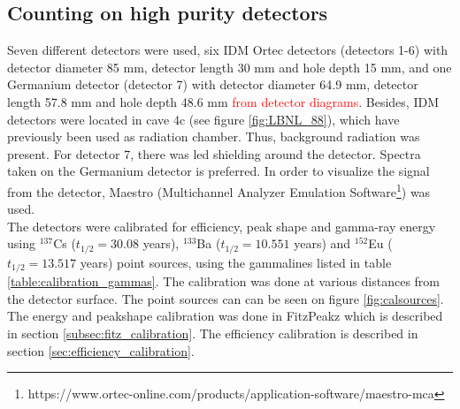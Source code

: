 \documentclass[a4paper,11pt,twoside]{book}
\begin{document}

\subsection{Counting on high purity detectors}

\noindent 
Seven different detectors were used, six IDM Ortec detectors (detectors 1-6) with detector diameter 85 mm, detector length 30 mm and hole depth 15 mm, and one Germanium detector (detector 7) with detector diameter 64.9 mm, detector length 57.8 mm and hole depth 48.6 mm \textcolor{red}{from detector diagrams}. Besides, IDM detectors were located in cave 4c (see figure \ref{fig:LBNL_88}), which have previously been used as radiation chamber. Thus, background radiation was present. For detector 7, there was led shielding around the detector. Spectra taken on the Germanium detector is preferred. In order to visualize the signal from the detector, Maestro  (Multichannel Analyzer Emulation Software\footnote{https://www.ortec-online.com/products/application-software/maestro-mca}) was used. \\ 

\noindent 
The detectors were calibrated for efficiency, peak shape and gamma-ray energy using $^{137}$Cs ($t_{1/2}=30.08$ years\cite{Browne2007}), $^{133}$Ba ($t_{1/2}=10.551$ years\cite{Khazov2011}) and $^{152}$Eu ($t_{1/2}=13.517$ years\cite{Martin2013}) point sources, using the gammalines listed in table \ref{table:calibration_gammas}. The calibration was done at various distances from the detector surface. The point sources can can be seen on figure \ref{fig:calsources}. The energy and peakshape calibration was done in FitzPeakz which is described in section \ref{subsec:fitz_calibration}. The efficiency calibration is described in section \ref{sec:efficiency_calibration}. \\ 
\end{document}
